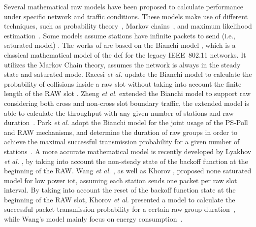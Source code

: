 Several mathematical \gls{raw} models have been proposed to calculate  performance under specific network and traffic conditions. These models make use of different techniques, such as probability theory~\cite{Wang2015}, Markov chains~\cite{Raeesi2014a, Khorov2015b,Zheng2014, Evgeny2018, Khorov2015b, Park2014b}, and maximum likelihood estimation~\cite{Park2014b}. Some models  assume stations have infinite packets to send (i.e., saturated model)  \cite{Raeesi2014a, Zheng2014, Park2014b, Evgeny2018}. The works of \cite{Raeesi2014a, Zheng2014, Park2014b} are based on the Bianchi model \cite{bianchi2000performance}, which is a classical mathematical model of the \gls{dcf} for the legacy IEEE~802.11 networks. It utilizes the Markov Chain theory, assumes the network is always in the steady state and saturated mode. Raeesi \textit{et al.}  update the Bianchi model to calculate the probability of collisions inside a \gls{raw} slot without taking into account the finite length of the RAW slot \cite{Raeesi2014a}. Zheng \textit{et al.} extended the Bianchi model to support \gls{raw} considering both cross and non-cross slot boundary traffic, the extended model is able to calculate the throughput with any given number of stations and \gls{raw} duration~\cite{Zheng2014}. Park \textit{et al.} adopt the Bianchi model for the  joint usage of the PS-Poll and RAW mechanisms, and determine the duration of \gls{raw} groups in order to achieve the maximal successful transmission probability for a given number of stations~\cite{Park2014b}. A more accurate mathematical model is recently developed by Lyakhov \textit{et al.} \cite{Evgeny2018}, by taking into account the non-steady state of the backoff function at the beginning of the RAW. Wang \textit{et al.} \cite{Wang2015} , as well as Khorov \cite{Khorov2015b}, proposed none saturated model for low power \gls{iot}, assuming each station sends one packet per \gls{raw} slot interval. By taking into account the reset of the backoff function state at the beginning of the RAW slot, Khorov \textit{et al.} presented a model to calculate the successful packet transmission probability for a certain \gls{raw} group duration~\cite{Khorov2015b}, while Wang's model mainly focus on energy consumption~\cite{Wang2015}. 


